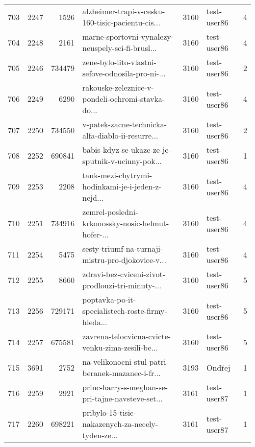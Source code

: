 \begin{tabular}{lrrlrlr}
703  &       2247 &     1526 &  alzheimer-trapi-v-cesku-160-tisic-pacientu-cis... &     3160 &                  test-user86 &               4 \\
704  &       2248 &     2161 &  marne-sportovni-vynalezy-neuspely-sci-fi-brusl... &     3160 &                  test-user86 &               4 \\
705  &       2246 &   734479 &  zene-bylo-lito-vlastni-sefove-odnosila-pro-ni-... &     3160 &                  test-user86 &               2 \\
706  &       2249 &     6290 &  rakouske-zeleznice-v-pondeli-ochromi-stavka-do... &     3160 &                  test-user86 &               4 \\
707  &       2250 &   734550 &  v-patek-zacne-technicka-alfa-diablo-ii-resurre... &     3160 &                  test-user86 &               2 \\
708  &       2252 &   690841 &  babis-kdyz-se-ukaze-ze-je-sputnik-v-ucinny-pok... &     3160 &                  test-user86 &               1 \\
709  &       2253 &     2208 &  tank-mezi-chytrymi-hodinkami-je-i-jeden-z-nejd... &     3160 &                  test-user86 &               4 \\
710  &       2251 &   734916 &  zemrel-posledni-krkonossky-nosic-helmut-hofer-... &     3160 &                  test-user86 &               4 \\
711  &       2254 &     5475 &  sesty-triumf-na-turnaji-mistru-pro-djokovice-v... &     3160 &                  test-user86 &               4 \\
712  &       2255 &     8660 &  zdravi-bez-cviceni-zivot-prodlouzi-tri-minuty-... &     3160 &                  test-user86 &               5 \\
713  &       2256 &   729171 &  poptavka-po-it-specialistech-roste-firmy-hleda... &     3160 &                  test-user86 &               5 \\
714  &       2257 &   675581 &  zavrena-telocvicna-cvicte-venku-zima-zesili-be... &     3160 &                  test-user86 &               5 \\
715  &       3691 &     2752 &  na-velikonocni-stul-patri-beranek-mazanec-i-fr... &     3193 &                       Ondřej &               1 \\
716  &       2259 &     2921 &  princ-harry-s-meghan-se-pri-tajne-navsteve-set... &     3161 &                  test-user87 &               1 \\
717  &       2260 &   698221 &  pribylo-15-tisic-nakazenych-za-necely-tyden-ze... &     3161 &                  test-user87 &               1 \\

\end{tabular}
